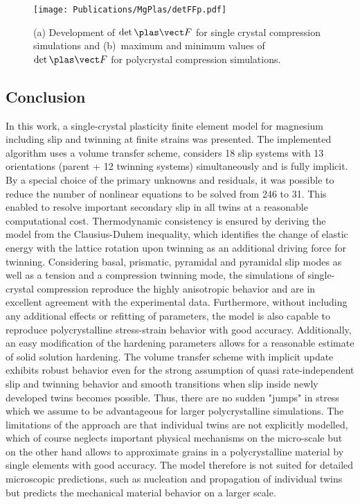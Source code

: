   \begin{figure}[!ht]
    \centering
    \texttt{[image: Publications/MgPlas/detFFp.pdf]}
    \caption[]{(a) Development of $\det{\FFp}$ for single crystal compression simulations and (b)~maximum and minimum values of $\det{\FFp}$ for polycrystal compression simulations.}
    \label{fig:detFFp}
  \end{figure}



  \subsection{Conclusion}

  In this work, a single-crystal plasticity finite element model for magnesium including slip and twinning at finite strains was presented. The implemented algorithm uses a volume transfer scheme, considers 18 slip systems with 13 orientations (parent + 12 twinning systems) simultaneously and is fully implicit. By a special choice of the primary unknowns and residuals, it was possible to reduce the number of nonlinear equations to be solved from 246 to 31. This enabled to resolve important secondary slip in all twins at a reasonable computational cost. Thermodynamic consistency is ensured by deriving the model from the Clausius-Duhem inequality, which identifies the change of elastic energy with the lattice rotation upon twinning as an additional driving force for twinning. Considering basal, prismatic, pyramidal \pyra and pyramidal \pyrac slip modes as well as a tension and a compression twinning mode, the simulations of single-crystal compression reproduce the highly anisotropic behavior and are in excellent agreement with the experimental data. Furthermore, without including any additional effects or refitting of parameters, the model is also capable to reproduce polycrystalline stress-strain behavior with good accuracy. Additionally, an easy modification of the hardening parameters allows for a reasonable estimate of solid solution hardening. The volume transfer scheme with implicit update exhibits robust behavior even for the strong assumption of quasi rate-independent slip and twinning behavior and smooth transitions when slip inside newly developed twins becomes possible. Thus, there are no sudden "jumps" in stress which we assume to be advantageous for larger polycrystalline simulations. The limitations of the approach are that individual twins are not explicitly modelled, which of course neglects important physical mechanisms on the micro-scale but on the other hand allows to approximate grains in a polycrystalline material by single elements with good accuracy. The model therefore is not suited for detailed microscopic predictions, such as nucleation and propagation of individual twins but predicts the mechanical material behavior on a larger scale. \\

